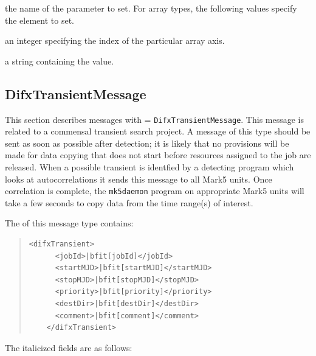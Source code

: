 \begin{description}
\begin{description}
\item{} the name of the parameter to set.
For array types, the following  values specify the element to set.
\item{} an integer specifying the index of the particular array axis.
\item{} a string containing the value.

\end{description}







\subsection{DifxTransientMessage}

This section describes messages with  = {\tt DifxTransientMessage}.
This message is related to a commensal transient search project.
A message of this type should be sent as soon as possible after detection; it is likely that no provisions will be made for data copying that does not start before resources assigned to the job are released.
When a possible transient is identfied by a detecting program which looks at autocorrelations it sends this message to all Mark5 units.  
Once correlation is complete, the {\tt mk5daemon} program on appropriate Mark5 units will take a few seconds to copy data from the time range(s) of interest.

The  of this message type contains:

\begin{quotation}
\begin{Verbatim}[commandchars=\|\[\]]
    <difxTransient>
      <jobId>|bfit[jobId]</jobId>
      <startMJD>|bfit[startMJD]</startMJD>
      <stopMJD>|bfit[stopMJD]</stopMJD>
      <priority>|bfit[priority]</priority>
      <destDir>|bfit[destDir]</destDir>
      <comment>|bfit[comment]</comment>
    </difxTransient>
\end{Verbatim}
\end{quotation}

\noindent The italicized fields are as follows:


\end{description}

